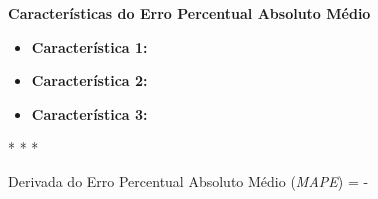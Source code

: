 \textbf{Características do Erro Percentual Absoluto Médio}
\vspace{1em}

\begin{itemize}
    \item \textbf{Característica 1:}
    \item \textbf{Característica 2:}
    \item \textbf{Característica 3:}
\end{itemize}

\medskip
\begin{center}
 * * *
\end{center}
\medskip

\begin{equacaodestaque}{Derivada do Erro Percentual Absoluto Médio (\textit{MAPE})}
     = -  \cdot {}
    \label{eq:mape-derivada}
\end{equacaodestaque}

